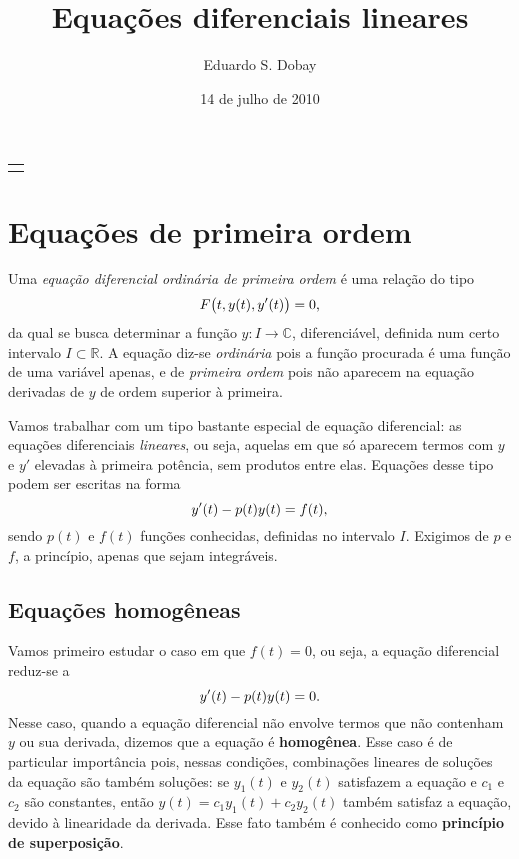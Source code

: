 \documentclass[12pt,a4paper,oneside]{memoir}
\title{Equações diferenciais lineares}
\author{Eduardo S. Dobay}
\date{14 de julho de 2010}
\makeatletter
\newcommand{\C}{\mathbb{C}}
\newcommand{\R}{\mathbb{R}}
\renewcommand{\maketitle}{
  \begin{center}
    {\Large\bfseries\@title\par\medskip}
    {\large\scshape
    \begin{tabular}[t]{c}%
    \@author
    \end{tabular}\par\medskip}
    {\itshape\@date\par}
  \end{center}}
\makeatother
\begin{document}
\maketitle
\thispagestyle{empty}

{\color[rgb]{0.45 0.45 0.5}
\tableofcontents*}


\setlength{\parskip}{3pt}

\chapter{Equações de primeira ordem}

Uma \emph{equação diferencial ordinária de primeira ordem} é uma relação do tipo
\begin{equation}
  F \big(t, y(t), y'(t) \big) = 0 \text,
\end{equation}
da qual se busca determinar a função $y : I \to \C$, diferenciável, definida num certo intervalo $I \subset \R$.  A equação diz-se \emph{ordinária} pois a função procurada é uma função de uma variável apenas, e de \emph{primeira ordem} pois não aparecem na equação derivadas de $y$ de ordem superior à primeira.

Vamos trabalhar com um tipo bastante especial de equação diferencial: as equações diferenciais \emph{lineares}, ou seja, aquelas em que só aparecem termos com $y$ e $y'$ elevadas à primeira potência, sem produtos entre elas.  Equações desse tipo podem ser escritas na forma
\begin{equation}
\label{edo1-funcao}
  y'(t) - p(t) y(t) = f(t) \text,
\end{equation}
sendo $p(t)$ e $f(t)$ funções conhecidas, definidas no intervalo $I$.  Exigimos de $p$ e $f$, a princípio, apenas que sejam integráveis.


\section{Equações homogêneas}

Vamos primeiro estudar o caso em que $f(t) = 0$, ou seja, a equação diferencial reduz-se a
\begin{equation}
\label{edo1h-funcao}
  y'(t) - p(t) y(t) = 0 \text.
\end{equation}
Nesse caso, quando a equação diferencial não envolve termos que não contenham $y$ ou sua derivada, dizemos que a equação é \textbf{homogênea}.  Esse caso é de particular importância pois, nessas condições, combinações lineares de soluções da equação são também soluções: se $y_1(t)$ e $y_2(t)$ satisfazem a equação e $c_1$ e $c_2$ são constantes, então $y(t) = c_1 y_1(t) + c_2 y_2(t)$ também satisfaz a equação, devido à linearidade da derivada.  Esse fato também é conhecido como \textbf{princípio de superposição}.
\end{document}
